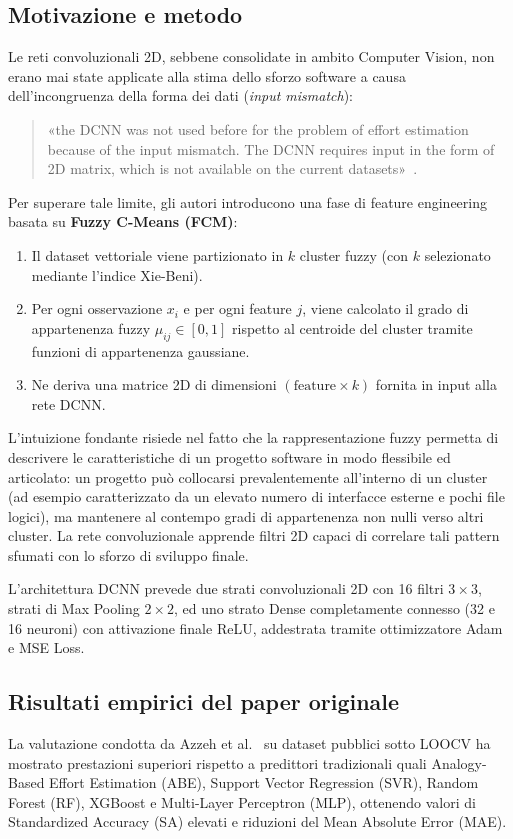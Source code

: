 \documentclass[11pt, a4paper]{article}
\begin{document}
\subsection{Motivazione e metodo}
Le reti convoluzionali 2D, sebbene consolidate in ambito Computer Vision, non erano mai state applicate alla stima dello sforzo software a causa dell'incongruenza della forma dei dati (\textit{input mismatch}): \begin{quote}
    «the DCNN was not used before for the problem of effort estimation because of the input mismatch. The DCNN requires input in the form of 2D matrix, which is not available on the current datasets»~\cite{article}.
\end{quote}

Per superare tale limite, gli autori introducono una fase di feature engineering basata su \textbf{Fuzzy C-Means (FCM)}:
\begin{enumerate}
    \item Il dataset vettoriale viene partizionato in $k$ cluster fuzzy (con $k$ selezionato mediante l'indice Xie-Beni).
    \item Per ogni osservazione $x_i$ e per ogni feature $j$, viene calcolato il grado di appartenenza fuzzy $\mu_{ij} \in [0, 1]$ rispetto al centroide del cluster tramite funzioni di appartenenza gaussiane.
    \item Ne deriva una matrice 2D di dimensioni $(\text{feature} \times k)$ fornita in input alla rete DCNN.\
\end{enumerate}

L'intuizione fondante risiede nel fatto che la rappresentazione fuzzy permetta di descrivere le caratteristiche di un progetto software in modo flessibile ed articolato: un progetto può collocarsi prevalentemente all'interno di un cluster (ad esempio caratterizzato da un elevato numero di interfacce esterne e pochi file logici), ma mantenere al contempo gradi di appartenenza non nulli verso altri cluster. La rete convoluzionale apprende filtri 2D capaci di correlare tali pattern sfumati con lo sforzo di sviluppo finale.

L'architettura DCNN prevede due strati convoluzionali 2D con 16 filtri $3\times3$, strati di Max Pooling $2\times2$, ed uno strato Dense completamente connesso (32 e 16 neuroni) con attivazione finale ReLU, addestrata tramite ottimizzatore Adam e MSE Loss.

\subsection{Risultati empirici del paper originale}
La valutazione condotta da Azzeh et al.~\cite{article} su dataset pubblici sotto LOOCV ha mostrato prestazioni superiori rispetto a predittori tradizionali quali Analogy-Based Effort Estimation (ABE), Support Vector Regression (SVR), Random Forest (RF), XGBoost e Multi-Layer Perceptron (MLP), ottenendo valori di Standardized Accuracy (SA) elevati e riduzioni del Mean Absolute Error (MAE).
\end{document}

